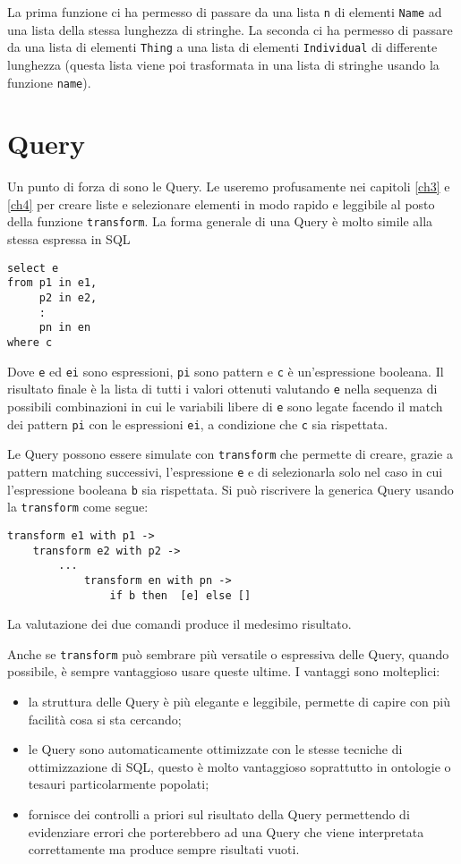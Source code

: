 La prima funzione ci ha permesso di passare da una lista \verb|n| di elementi \verb|Name| ad una lista della stessa lunghezza di stringhe. La seconda ci ha permesso di passare da una lista di elementi \verb|Thing| a una lista di elementi \verb|Individual| di differente lunghezza (questa lista viene poi trasformata in una lista di stringhe usando la funzione \verb|name|).
\section{Query}
Un punto di forza di \cduce sono le Query. Le useremo profusamente nei capitoli \ref{ch3} e \ref{ch4} per creare liste e selezionare elementi in modo rapido e leggibile al posto della  funzione \verb|transform|.
La forma generale di una Query è molto simile alla stessa espressa in SQL
\begin{verbatim}
select e 
from p1 in e1,
	 p2 in e2,
	 :
	 pn in en
where c
\end{verbatim}
Dove \verb|e| ed \verb|ei| sono espressioni, \verb|pi| sono pattern e \verb|c| è un'espressione booleana. Il risultato finale è la lista di tutti i valori ottenuti valutando \verb|e| nella sequenza di possibili combinazioni in cui le variabili libere di \verb|e| sono legate facendo il match dei pattern \verb|pi| con le espressioni \verb|ei|, a condizione che \verb|c| sia rispettata.

Le Query possono essere simulate con \verb|transform| che permette di creare, grazie a pattern matching successivi, l'espressione \verb|e| e di selezionarla solo nel caso in cui l'espressione booleana \verb|b| sia rispettata. Si può riscrivere la generica Query usando la \verb|transform| come segue:
\begin{verbatim}
transform e1 with p1 -> 
	transform e2 with p2 -> 
		...
			transform en with pn -> 
				if b then  [e] else []
\end{verbatim}
La valutazione dei due comandi produce il medesimo risultato.

Anche se \verb|transform| può sembrare più versatile o espressiva delle Query, quando possibile, è sempre vantaggioso usare queste ultime. I vantaggi sono molteplici:
\begin{itemize}
	\item la struttura delle Query è più elegante e leggibile, permette di capire con più facilità cosa si sta cercando;
	\item le Query sono automaticamente ottimizzate con le stesse tecniche di ottimizzazione di SQL, questo è molto vantaggioso soprattutto in ontologie o tesauri particolarmente popolati;
	\item \cduce fornisce dei controlli a priori sul risultato della Query permettendo di evidenziare errori che porterebbero ad una Query che viene interpretata correttamente ma produce sempre risultati vuoti.
\end{itemize}

